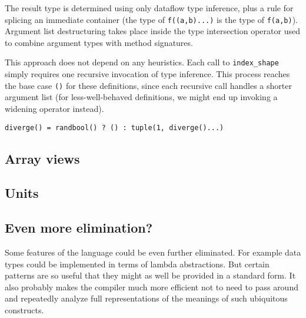 The result type is determined using only dataflow type inference, plus a
rule for splicing an immediate container (the type of \texttt{f((a,b)...)} is
the type of \texttt{f(a,b)}). Argument list destructuring takes place inside
the type intersection operator used to combine argument types with method
signatures.

This approach does not depend on any heuristics. Each call to \texttt{index\_shape}
simply requires one recursive invocation of type inference. This process reaches
the base case \texttt{()} for these definitions, since each recursive call
handles a shorter argument list (for less-well-behaved definitions, we might
end up invoking a widening operator instead).


\begin{verbatim}
diverge() = randbool() ? () : tuple(1, diverge()...)
\end{verbatim}

\subsection{Array views}

\subsection{Units}

\subsection{Even more elimination?}

Some features of the language could be even further eliminated. For example data
types could be implemented in terms of lambda abstractions. But certain patterns
are so useful that they might as well be provided in a standard form. It also
probably makes the compiler much more efficient not to need to pass around and
repeatedly analyze full representations of the meanings of such ubiquitous constructs.
